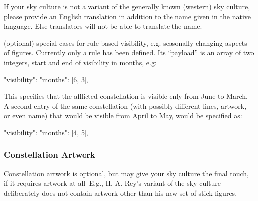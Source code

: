 \begin{description}
	If your sky culture is not a variant of the generally known  (western)
	sky culture, please provide an English translation in addition to the name given in
	the native language. Else translators will not be able to translate
	the name. 

\item[\jtag{visibility}] (optional) special cases for rule-based visibility, e.g. seasonally changing aspects of figures. 
	Currently only a  rule has been defined. 
	Its ``payload'' is an array of two integers, start and end of visibility in months, e.g:

	\begin{jsonfile}
"visibility": {"months": [6, 3]},
	\end{jsonfile}
%
This specifies that the afflicted constellation is visible only from June to March. 
A second entry of the same constellation (with possibly different lines, artwork, or even name) 
that would be visible from April to May, would be specified as:
\begin{jsonfile}
"visibility": {"months": [4, 5]},
\end{jsonfile}
\end{description}







\iffalse REFERENCE?
You can \newFeature{0.19.2} add a reference comment after each
3-column entry. Just add a white-space, and then a comma-separated list
of numerical references to the books listed in \file{reference.fab}.
\fi



\subsubsection{Constellation Artwork}
\label{sec:skycultures:artwork}
\label{SC:image}

Constellation artwork is optional, but may give your sky culture the
final touch, if it requires artwork at all. E.g., H. A. Rey's variant
of the  sky culture deliberately does not contain artwork
other than his new set of stick figures.

